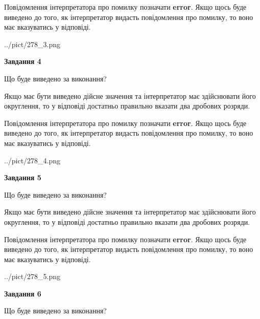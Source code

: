 \documentclass[12pt, ukrainian]{article}
\begin{document}
{\begin {Large}
Повідомлення інтерпретатора про помилку позначати \textbf{error}.
Якщо щось буде виведено до того, як інтерпретатор видасть повідомлення про помилку, 
то воно має вказуватись у відповіді. \par

\begin{center}
	{../pict/278_3.png}
\end{center}
\newpage

{\begin {center}\textbf{Завдання 4}\end {center}}\par
Що буде виведено за виконання? \par

Якщо має бути виведено дійсне значення та інтерпретатор має здійснювати його округлення, 
то у відповіді достатньо правильно вказати два дробових розряди.

Повідомлення інтерпретатора про помилку позначати \textbf{error}.
Якщо щось буде виведено до того, як інтерпретатор видасть повідомлення про помилку, 
то воно має вказуватись у відповіді. \par

\begin{center}
	{../pict/278_4.png}
\end{center}
\newpage

{\begin {center}\textbf{Завдання 5}\end {center}}\par
Що буде виведено за виконання? \par

Якщо має бути виведено дійсне значення та інтерпретатор має здійснювати його округлення, 
то у відповіді достатньо правильно вказати два дробових розряди.

Повідомлення інтерпретатора про помилку позначати \textbf{error}.
Якщо щось буде виведено до того, як інтерпретатор видасть повідомлення про помилку, 
то воно має вказуватись у відповіді. \par

\begin{center}
	{../pict/278_5.png}
\end{center}
\newpage

{\begin {center}\textbf{Завдання 6}\end {center}}\par
Що буде виведено за виконання? \par


\end{Large}}
\end{document}

